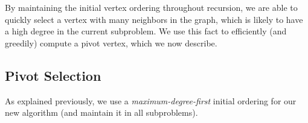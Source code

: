 \documentclass[final,1p]{elsarticle-modified}
\begin{document}
By maintaining the initial vertex ordering throughout recursion, we are able to quickly select a vertex with many neighbors in the graph, which is likely to have a high degree in the current subproblem. We use this fact to efficiently (and greedily) compute a pivot vertex, which we now describe.






\subsection{Pivot Selection}
As explained previously, we use a \emph{maximum-degree-first} initial ordering for our new algorithm (and maintain it in all subproblems). 
\end{document}
